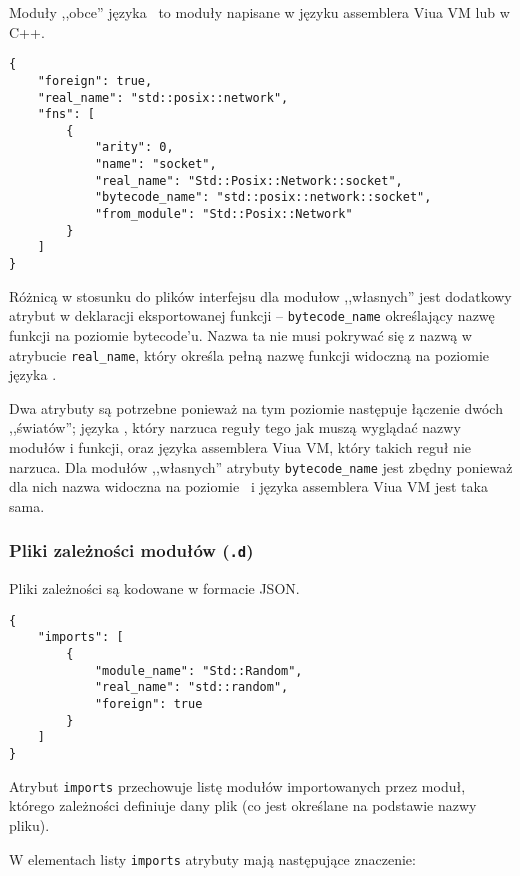 Moduły ,,obce'' języka \ViuAct\ to moduły napisane w języku assemblera Viua VM lub w C++.

\begin{small}
\begin{lstlisting}
{
    "foreign": true,
    "real_name": "std::posix::network",
    "fns": [
        {
            "arity": 0,
            "name": "socket",
            "real_name": "Std::Posix::Network::socket",
            "bytecode_name": "std::posix::network::socket",
            "from_module": "Std::Posix::Network"
        }
    ]
}
\end{lstlisting}
\end{small}

Różnicą w stosunku do plików interfejsu dla modułow ,,własnych'' jest dodatkowy atrybut w deklaracji
eksportowanej funkcji -- \texttt{bytecode\_name} określający nazwę funkcji na poziomie bytecode'u. Nazwa ta
nie musi pokrywać się z nazwą w atrybucie \texttt{real\_name}, który określa pełną nazwę funkcji widoczną na
poziomie języka \ViuAct.

Dwa atrybuty są potrzebne ponieważ na tym poziomie następuje łączenie dwóch ,,światów''; języka \ViuAct, który
narzuca reguły tego jak muszą wyglądać nazwy modułów i funkcji, oraz języka assemblera Viua VM, który takich
reguł nie narzuca. Dla modułów ,,własnych'' atrybuty \texttt{bytecode\_name} jest zbędny ponieważ dla nich
nazwa widoczna na poziomie \ViuAct\ i języka assemblera Viua VM jest taka sama.

\subsubsection{Pliki zależności modułów (\texttt{.d})}
\label{pliki_zaleznosci_modulow}

Pliki zależności są kodowane w formacie JSON.

\begin{small}
\begin{lstlisting}
{
    "imports": [
        {
            "module_name": "Std::Random",
            "real_name": "std::random",
            "foreign": true
        }
    ]
}
\end{lstlisting}
\end{small}

Atrybut \texttt{imports} przechowuje listę modułów importowanych przez moduł, którego zależności definiuje
dany plik (co jest określane na podstawie nazwy pliku).

W elementach listy \texttt{imports} atrybuty mają następujące znaczenie:

